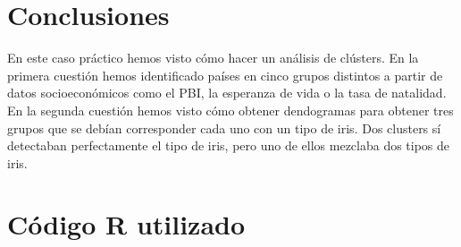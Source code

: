\documentclass[12pt,a4paper,twoside,openright,titlepage,final]{article}
\begin{document}
\section{Conclusiones}

En este caso práctico hemos visto cómo hacer un análisis de clústers. En la primera cuestión hemos identificado países en cinco grupos distintos a partir de datos socioeconómicos como el PBI, la esperanza de vida o la tasa de natalidad. En la segunda cuestión hemos visto cómo obtener dendogramas para obtener tres grupos que se debían corresponder cada uno con un tipo de iris. Dos clusters sí detectaban perfectamente el tipo de iris, pero uno de ellos mezclaba dos tipos de iris.

\clearpage

\section{Código R utilizado}


\end{document}

